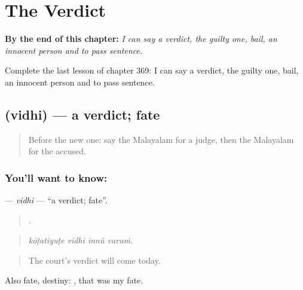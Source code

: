 
\chapter{The Verdict}
\label{ch:ml-the-verdict}

\begin{chapteropening}
\textbf{By the end of this chapter:} \emph{I can say a verdict, the guilty one, bail, an innocent person and to pass sentence.}

Complete the last lesson of chapter 369: I can say a verdict, the guilty one, bail, an innocent person and to pass sentence.
\end{chapteropening}

\section[\texorpdfstring{\ml{വിധി} (vidhi)}{വിധി (vidhi)}]{ (vidhi) — a verdict; fate}

\label{lesson:ML-C369-vidhi}



\begin{quote}
Before the new one: say the Malayalam for a judge, then the Malayalam for the accused.
\end{quote}

\subsection*{You'll want to know: }
\textbf{} — \emph{vidhi} — \textquotedblleft{}a verdict; fate\textquotedblright{}.

\begin{quote}
   .
\end{quote}

\begin{quote}
\emph{kōṭatiyuṭe vidhi innŭ varuṁ.}
\end{quote}

\begin{quote}
The court's verdict will come today.
\end{quote}

Also fate, destiny:    , that was my fate.

